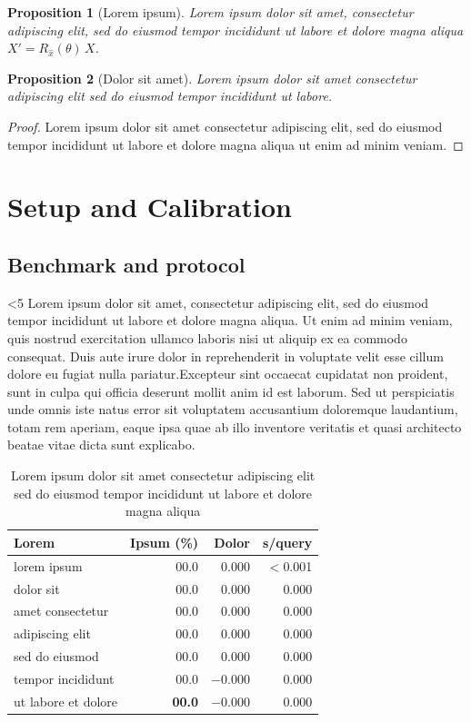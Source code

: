 \documentclass[10pt,twocolumn,letterpaper]{article}
\newcommand{\toprule}{\hline}
\newcommand{\midrule}{\hline}
\newcommand{\bottomrule}{\hline}}
\newtheorem{proposition}{Proposition}
\newcommand{\lipA}{Lorem ipsum dolor sit amet, consectetur adipiscing elit,
sed do eiusmod tempor incididunt ut labore et dolore magna aliqua. Ut enim ad
minim veniam, quis nostrud exercitation ullamco laboris nisi ut aliquip ex ea
commodo consequat. Duis aute irure dolor in reprehenderit in voluptate velit
esse cillum dolore eu fugiat nulla pariatur.}
\newcommand{\lipB}{Excepteur sint occaecat cupidatat non proident, sunt in
culpa qui officia deserunt mollit anim id est laborum. Sed ut perspiciatis unde
omnis iste natus error sit voluptatem accusantium doloremque laudantium, totam
rem aperiam, eaque ipsa quae ab illo inventore veritatis et quasi architecto
beatae vitae dicta sunt explicabo.}
\newcounter{fillc}
\newcommand{\filler}[1]{%
  \setcounter{fillc}{0}%
  \loop\ifnum\value{fillc}<#1\relax
    \stepcounter{fillc}%
    \ifodd\value{fillc}\lipA\else\lipB\fi\par
  \repeat}
\begin{document}
\begin{proposition}[Lorem ipsum]
\label{prop:one}
Lorem ipsum dolor sit amet, consectetur adipiscing elit, sed do eiusmod tempor
incididunt ut labore et dolore magna aliqua $X' = R_{\hat{x}}(\theta)\,X$.
\end{proposition}

\begin{proposition}[Dolor sit amet]
\label{prop:two}
Lorem ipsum dolor sit amet consectetur adipiscing elit sed do eiusmod tempor
incididunt ut labore.
\end{proposition}
\begin{proof}
Lorem ipsum dolor sit amet consectetur adipiscing elit, sed do eiusmod tempor
incididunt ut labore et dolore magna aliqua ut enim ad minim veniam.
\end{proof}

\section{Setup and Calibration}
\subsection{Benchmark and protocol}
\filler{5}

\begin{table}[t]
\centering
\footnotesize
\setlength{\tabcolsep}{3.5pt}
\begin{tabular}{@{}lrrr@{}}
\toprule
Lorem & Ipsum (\%) & Dolor & s/query \\
\midrule
lorem ipsum          & 00.0 & 0.000 & $<$0.001 \\
dolor sit            & 00.0 & 0.000 & 0.000 \\
amet consectetur     & 00.0 & 0.000 & 0.000 \\
adipiscing elit      & 00.0 & 0.000 & 0.000 \\
sed do eiusmod       & 00.0 & 0.000 & 0.000 \\
\midrule
tempor incididunt    & 00.0 & $-$0.000 & 0.000 \\
ut labore et dolore  & \textbf{00.0} & $-$0.000 & 0.000 \\
\bottomrule
\end{tabular}
\caption{Lorem ipsum dolor sit amet consectetur adipiscing elit sed do eiusmod
tempor incididunt ut labore et dolore magna aliqua}
\label{tab:floors}
\end{table}
\end{document}
